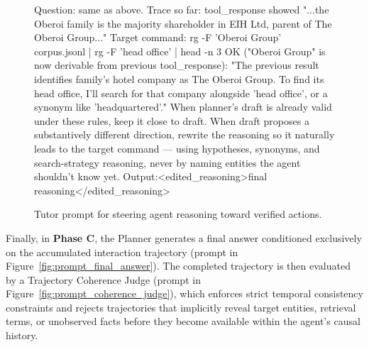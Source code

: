 \documentclass{article} %
\begin{document}
\begin{figure}[!t]
\begin{promptbox}
Question: same as above. Trace so far: tool_response showed "...the Oberoi family is the majority shareholder in EIH Ltd, parent of The Oberoi Group..." Target command: rg -F 'Oberoi Group' corpus.jsonl | rg -F 'head office' | head -n 3
OK ("Oberoi Group" is now derivable from previous tool_response): "The previous result identifies family's hotel company as The Oberoi Group. To find its head office, I'll search for that company alongside 'head office', or a synonym like 'headquartered'."
When planner's draft is already valid under these rules, keep it close to draft. When draft proposes a substantively different direction, rewrite the reasoning so it naturally leads to the target command — using hypotheses, synonyms, and search-strategy reasoning, never by naming entities the agent shouldn't know yet.
Output:<edited_reasoning>final reasoning</edited_reasoning>
\end{promptbox}
\vspace{-0.4cm}
\caption{Tutor prompt for steering agent reasoning toward verified actions.}
\label{fig:prompt_tutor_edit}
\end{figure}

Finally, in \textbf{Phase C}, the Planner generates a final answer conditioned exclusively on the accumulated interaction trajectory (prompt in Figure~\ref{fig:prompt_final_answer}). The completed trajectory is then evaluated by a Trajectory Coherence Judge (prompt in Figure~\ref{fig:prompt_coherence_judge}), which enforces strict temporal consistency constraints and rejects trajectories that implicitly reveal target entities, retrieval terms, or unobserved facts before they become available within the agent's causal history.


\end{document}
